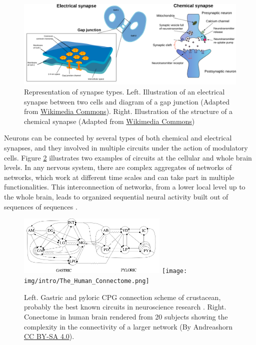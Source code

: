 \begin{figure}[hbt!]
    \centering
    \includegraphics[width=\linewidth]{img/intro/synapses.pdf}
    \caption{Representation of synapse types. Left. Illustration of an electrical synapse between two cells and diagram of a gap junction (Adapted from \href{https://commons.wikimedia.org/wiki/File:Gap_cell_junction-en.svg}{Wikimedia Commons}). Right. Illustration of the structure of a chemical synapse (Adapted from \href{https://commons.wikimedia.org/wiki/File:Synapse_diag1.svg}{Wikimedia Commons})}
    \label{fig:synapse-types}
\end{figure}

Neurons can be connected by several types of both chemical and electrical synapses, and they involved in multiple circuits under the action of modulatory cells. Figure \ref{fig:neural circuits} illustrates two examples of circuits at the cellular and whole brain levels. In any nervous system, there are complex aggregates of networks of networks, which work at different time scales and can take part in multiple functionalities. This interconnection of networks, from a lower local level up to the whole brain, leads to organized sequential neural activity built out of sequences of sequences \parencite{rabinovich_sequential_2020}.


\begin{figure}[hbt!]
    \centering
    \includegraphics[width=0.64\textwidth]{img/intro/cpg diagram.png}
    \texttt{[image: img/intro/The\_Human\_Connectome.png]}
    \caption{Left. Gastric and pyloric CPG connection scheme of crustacean, probably the best known circuits in neuroscience research \parencite{huerta_topology_2001}. Right. Conectome in human brain rendered from 20 subjects showing the complexity in the connectivity of a larger network (By Andreashorn \href{https://commons.wikimedia.org/w/index.php?curid=41581320}{CC BY-SA 4.0}).}
    \label{fig:neural circuits}
\end{figure}

